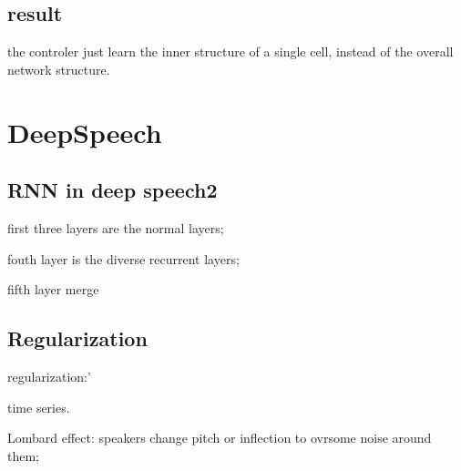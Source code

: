 \documentclass[12pt]{article}
\begin{document}
\subsection{result}

the controler just learn the inner structure of a single cell, instead of the overall network structure.

\section{DeepSpeech}


\subsection{RNN in deep speech2}

first three layers are the normal layers;

fouth layer is the diverse recurrent layers;

fifth layer merge

\subsection{Regularization}
regularization:'

time series.

Lombard effect: speakers change pitch or inflection to ovrsome noise around them;
\end{document}
